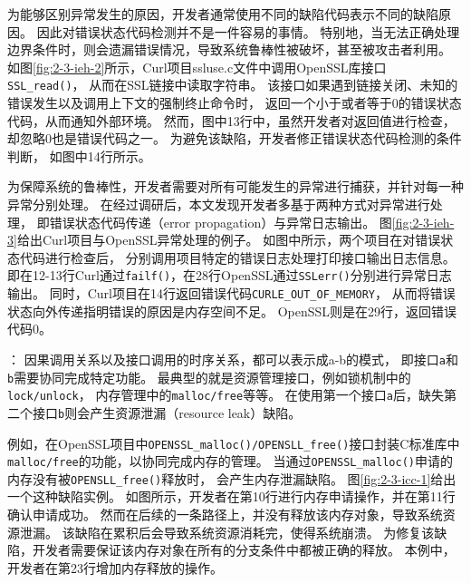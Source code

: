 

为能够区别异常发生的原因，开发者通常使用不同的缺陷代码表示不同的缺陷原因。
因此对错误状态代码检测并不是一件容易的事情。
特别地，当无法正确处理边界条件时，则会遗漏错误情况，导致系统鲁棒性被破坏，甚至被攻击者利用。
如图\ref{fig:2-3-ieh-2}所示，Curl项目ssluse.c文件中调用OpenSSL库接口\texttt{SSL\_read()}，
从而在SSL链接中读取字符串。
该接口如果遇到链接关闭、未知的错误发生以及调用上下文的强制终止命令时，
返回一个小于或者等于0的错误状态代码，从而通知外部环境。
然而，图中13行中，虽然开发者对返回值进行检查，却忽略0也是错误代码之一。
为避免该缺陷，开发者修正错误状态代码检测的条件判断，
如图中14行所示。



为保障系统的鲁棒性，开发者需要对所有可能发生的异常进行捕获，并针对每一种异常分别处理。
在经过调研后，本文发现开发者多基于两种方式对异常进行处理，
即错误状态代码传递（error propagation）与异常日志输出。
图\ref{fig:2-3-ieh-3}给出Curl项目与OpenSSL异常处理的例子。
如图中所示，两个项目在对错误状态代码进行检查后，
分别调用项目特定的错误日志处理打印接口输出日志信息。
即在12-13行Curl通过\texttt{failf()}，在28行OpenSSL通过\texttt{SSLerr()}分别进行异常日志输出。
同时，Curl项目在14行返回错误代码\texttt{CURLE\_OUT\_OF\_MEMORY}，
从而将错误状态向外传递指明错误的原因是内存空间不足。
OpenSSL则是在29行，返回错误代码0。

\vspace*{10pt}
\begin{center}
	\noindent{}
\end{center}


：
因果调用关系以及接口调用的时序关系，都可以表示成a-b的模式，
即接口\texttt{a}和\texttt{b}需要协同完成特定功能。
最典型的就是资源管理接口，例如锁机制中的\texttt{lock/unlock}，
内存管理中的\texttt{malloc/free}等等。
在使用第一个接口\texttt{a}后，缺失第二个接口\texttt{b}则会产生资源泄漏（resource leak）缺陷。



例如，在OpenSSL项目中\texttt{OPENSSL\_malloc()/OPENSLL\_free()}接口封装C标准库中
\texttt{malloc/free}的功能，以协同完成内存的管理。
当通过\texttt{OPENSSL\_malloc()}申请的内存没有被\texttt{OPENSLL\_free()}释放时，
会产生内存泄漏缺陷。
图\ref{fig:2-3-icc-1}给出一个这种缺陷实例。
如图所示，开发者在第10行进行内存申请操作，并在第11行确认申请成功。
然而在后续的一条路径上，并没有释放该内存对象，导致系统资源泄漏。
该缺陷在累积后会导致系统资源消耗完，使得系统崩溃。
为修复该缺陷，开发者需要保证该内存对象在所有的分支条件中都被正确的释放。
本例中，开发者在第23行增加内存释放的操作。

